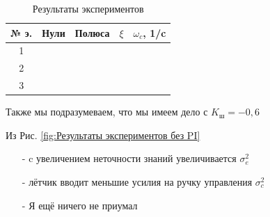 \begin{table}[H]
    \caption{Результаты экспериментов}
    \centering
    \label{tab:Результаты экспериментов без PI2}
    \begin{tabular}{|c|c|c|c|c|}
        \hline 
        № э.&Нули & Полюса & $\xi$ & $\omega_c$, 1/c \\ \hline 
        1&  &  & & \\ \hline
        2&  &   &  & \\ \hline
        3&  &  &  &\\ \hline

    \end{tabular}
\end{table}
    Также мы подразумеваем, что мы имеем дело с $K_\text{ш} = -0,6$

    Из Рис. {\ref{fig:Результаты экспериментов без PI}}
    \begin{itemize}
        \item [-] c увеличением неточности знаний увеличивается $\sigma_e^2$
        \item [-] лётчик вводит меньшие усилия на ручку управления $\sigma^2_c$ 
        \item [-]  Я ещё ничего не приумал   
    \end{itemize}